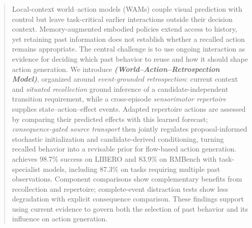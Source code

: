 \begin{abstract}
Local-context world--action models (WAMs) couple visual prediction with control but leave task-critical earlier interactions outside their decision context.
Memory-augmented embodied policies extend access to history, yet retaining past information does not establish whether a recalled action remains appropriate.
The central challenge is to use ongoing interaction as evidence for deciding which past behavior to reuse and how it should shape action generation.
We introduce \method{} \textit{\textbf{(\textbf{W}orld--\textbf{A}ction--\textbf{R}etrospection \textbf{M}odel)}}, organized around \emph{event-grounded retrospection}: current context and \emph{situated recollection} ground inference of a candidate-independent transition requirement, while a cross-episode \emph{sensorimotor repertoire} supplies state--action--effect events.
Adapted repertoire actions are assessed by comparing their predicted effects with this learned forecast; \emph{consequence-gated source transport} then jointly regulates proposal-informed stochastic initialization and candidate-derived conditioning, turning recalled behavior into a revisable prior for flow-based action generation.
\method{} achieves 98.7\% success on LIBERO and 83.9\% on RMBench with task-specialist models, including 87.3\% on tasks requiring multiple past observations.
Component comparisons show complementary benefits from recollection and repertoire; complete-event distraction tests show less degradation with explicit consequence comparison.
These findings support using current evidence to govern both the selection of past behavior and its influence on action generation.
\end{abstract}
